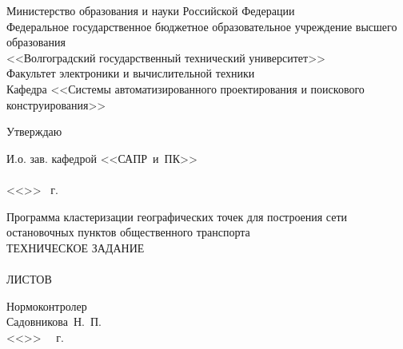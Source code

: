 \thispagestyle{empty}
\begin{center}
    Министерство образования и науки Российской Федерации \\
    Федеральное государственное бюджетное образовательное учреждение высшего образования\\
    <<Волгоградский государственный технический университет>>\\
    Факультет электроники и вычислительной техники\\
    Кафедра <<Системы автоматизированного проектирования и поискового конструирования>>
    \vspace{1em}
\end{center}
\begin{flushright}
    \begin{center}
        \hspace*{9.7em}Утверждаю
    \end{center}
    И.о. зав. кафедрой <<САПР~и~ПК>>\\
    \hspace{.5em}\\
    \vspace{.5em}<<\underline{\hspace{2.5em}}>> \underline{\hspace{8.5em}} \the\year\ г.
\end{flushright}
\vspace{1em}
\begin{center}
    Программа кластеризации географических точек для построения сети остановочных пунктов общественного транспорта\\
    ТЕХНИЧЕСКОЕ ЗАДАНИЕ\\
    \vspace{2em}
    \ORDERT\\
    ЛИСТОВ \pageref{LastPage}
\end{center}
\vspace{5em}
\begin{minipage}[t]{0.6\textwidth}
    \vspace{4em}
    \begin{flushleft}
        Нормоконтролер\\
        Садовникова~Н.~П.\\
        <<\LINE{1.5em}>>\ \LINE{7em} \the\year\ г.
    \end{flushleft}
\end{minipage}
